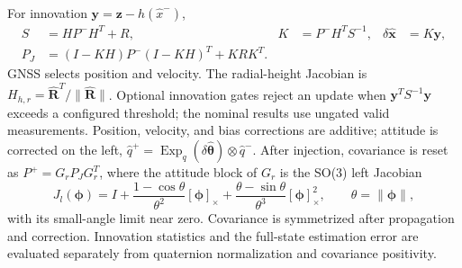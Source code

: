 For innovation $\bm y=\bm z-h(\widehat x^-)$,
\begin{align}
 S&=HP^-H^T+R,&K&=P^-H^TS^{-1},&\delta\widehat{\bm x}&=K\bm y,\\
 P_J&=(I-KH)P^-(I-KH)^T+KRK^T.
\end{align}
GNSS selects position and velocity. The radial-height Jacobian is
$H_{h,r}=\widehat{\bm R}^T/\|\widehat{\bm R}\|$.
Optional innovation gates reject an update when $\bm y^TS^{-1}\bm y$ exceeds a
configured threshold; the nominal results use ungated valid measurements.
Position, velocity, and bias corrections are additive; attitude is corrected on the left,
$\widehat q^+=\operatorname{Exp}_q(\delta\widehat{\bm\theta})\otimes\widehat q^-$.
After injection, covariance is reset as $P^+=G_rP_JG_r^T$, where the attitude block of
$G_r$ is the SO(3) left Jacobian
\begin{equation}
 J_l(\bm\phi)=I+\frac{1-\cos\theta}{\theta^2}[\bm\phi]_\times
 +\frac{\theta-\sin\theta}{\theta^3}[\bm\phi]_\times^2,
 \qquad\theta=\|\bm\phi\|,
\end{equation}
with its small-angle limit near zero. Covariance is symmetrized after propagation and
correction. Innovation statistics and the full-state estimation error are evaluated
separately from quaternion normalization and covariance positivity.
